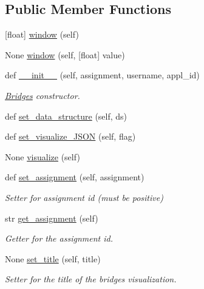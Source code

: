 \subsection*{Public Member Functions}
\begin{DoxyCompactItemize}
\item 
\mbox{[}float\mbox{]} \mbox{\hyperlink{classbridges_1_1bridges_1_1_bridges_abe7d2ce9cd70820a94914b8b2964b215}{window}} (self)
\item 
None \mbox{\hyperlink{classbridges_1_1bridges_1_1_bridges_a0bec2e26f9b318f4eb89ed7281565771}{window}} (self, \mbox{[}float\mbox{]} value)
\item 
def \mbox{\hyperlink{classbridges_1_1bridges_1_1_bridges_af174072883f6f269a9fe7cc02e12c276}{\+\_\+\+\_\+init\+\_\+\+\_\+}} (self, assignment, username, appl\+\_\+id)
\begin{DoxyCompactList}\small\item\em \mbox{\hyperlink{classbridges_1_1bridges_1_1_bridges}{Bridges}} constructor. \end{DoxyCompactList}\item 
def \mbox{\hyperlink{classbridges_1_1bridges_1_1_bridges_a868f02fa66c87c1a1fc7bd6fbc799291}{set\+\_\+data\+\_\+structure}} (self, ds)
\item 
def \mbox{\hyperlink{classbridges_1_1bridges_1_1_bridges_ab50d018b5178ca33de24157b7b6de285}{set\+\_\+visualize\+\_\+\+J\+S\+ON}} (self, flag)
\item 
None \mbox{\hyperlink{classbridges_1_1bridges_1_1_bridges_a822a7338e4dce27f7d8d0d322bdace08}{visualize}} (self)
\item 
def \mbox{\hyperlink{classbridges_1_1bridges_1_1_bridges_add46441bec1c93095c48adc724b90e12}{set\+\_\+assignment}} (self, assignment)
\begin{DoxyCompactList}\small\item\em Setter for assignment id (must be positive) \end{DoxyCompactList}\item 
str \mbox{\hyperlink{classbridges_1_1bridges_1_1_bridges_ae74fd60689c1cb3088c80e6097d14e73}{get\+\_\+assignment}} (self)
\begin{DoxyCompactList}\small\item\em Getter for the assignment id. \end{DoxyCompactList}\item 
None \mbox{\hyperlink{classbridges_1_1bridges_1_1_bridges_a46ecfa60298f97bd7605f1e224cfab10}{set\+\_\+title}} (self, title)
\begin{DoxyCompactList}\small\item\em Setter for the title of the bridges visualization. \end{DoxyCompactList}\item 

\end{DoxyCompactItemize}
